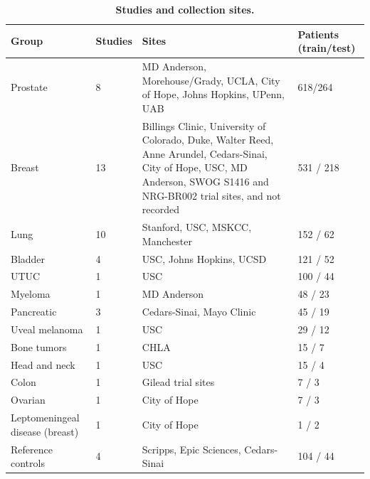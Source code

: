 \documentclass[11pt]{article}
\begin{document}
\begin{table}[!tbp]
\centering
\caption{\textbf{Studies and collection sites.}}
\label{stab:2}
\footnotesize
\setlength{\tabcolsep}{4pt}
\begin{tabular}{L{3.2cm} C{1.2cm} L{7.0cm} C{2.0cm}}
\toprule
Group & Studies & Sites & Patients (train/test) \\
\midrule
Prostate & 8 & MD Anderson, Morehouse/Grady, UCLA, City of Hope, Johns Hopkins, UPenn, UAB & 618/264 \\
Breast & 13 & Billings Clinic, University of Colorado, Duke, Walter Reed, Anne Arundel, Cedars-Sinai, City of Hope, USC, MD Anderson, SWOG S1416 and NRG-BR002 trial sites, and not recorded & 531 / 218 \\
Lung & 10 & Stanford, USC, MSKCC, Manchester & 152 / 62 \\
Bladder & 4 & USC, Johns Hopkins, UCSD & 121 / 52 \\
UTUC & 1 & USC & 100 / 44 \\
Myeloma & 1 & MD Anderson & 48 / 23 \\
Pancreatic & 3 & Cedars-Sinai, Mayo Clinic & 45 / 19 \\
Uveal melanoma & 1 & USC & 29 / 12 \\
Bone tumors & 1 & CHLA & 15 / 7 \\
Head and neck & 1 & USC & 15 / 4 \\
Colon & 1 & Gilead trial sites & 7 / 3 \\
Ovarian & 1 & City of Hope & 7 / 3 \\
Leptomeningeal disease (breast) & 1 & City of Hope & 1 / 2 \\
Reference controls & 4 & Scripps, Epic Sciences, Cedars-Sinai & 104 / 44 \\
\bottomrule
\end{tabular}
\end{table}
\end{document}

